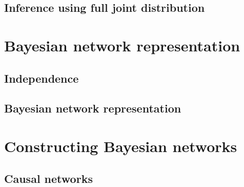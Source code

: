 \documentclass[12pt,a4paper,twoside]{book}
\begin{document}
\section{Inference using full joint distribution}

\label{s_1_2}

\chapter{Bayesian network representation}

\label{c_2}

\section{Independence}

\label{s_2_1}

\section{Bayesian network representation}

\label{s_2_2}

\chapter{Constructing Bayesian networks}

\label{c_3}

\section{Causal networks}

\label{s_3_1}
\end{document}
